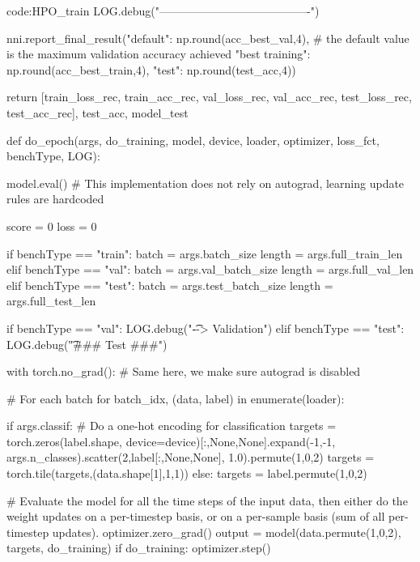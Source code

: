 \begin{mycodebox}{code:HPO_train}
        LOG.debug("----------------------------------------\n\n")

        nni.report_final_result({"default": np.round(acc_best_val,4), # the default value is the maximum validation accuracy achieved
                                 "best training": np.round(acc_best_train,4),
                                 "test": np.round(test_acc,4)})
    
    return [train_loss_rec, train_acc_rec, val_loss_rec, val_acc_rec, test_loss_rec, test_acc_rec], test_acc, model_test


def do_epoch(args, do_training, model, device, loader, optimizer, loss_fct, benchType, LOG):

    model.eval()    # This implementation does not rely on autograd, learning update rules are hardcoded
    
    score = 0
    loss = 0

    if benchType == "train":
        batch = args.batch_size
        length = args.full_train_len
    elif benchType == "val":
        batch = args.val_batch_size
        length = args.full_val_len
    elif benchType == "test":
        batch = args.test_batch_size
        length = args.full_test_len

    if benchType == "val":
        LOG.debug("\t --> Validation")
    elif benchType == "test":
        LOG.debug("\t ### Test ###")
    
    with torch.no_grad():   # Same here, we make sure autograd is disabled
        
        # For each batch
        for batch_idx, (data, label) in enumerate(loader):

            if args.classif:    # Do a one-hot encoding for classification
                targets = torch.zeros(label.shape, 
                    device=device)[:,None,None].expand(-1,-1,
                        args.n_classes).scatter(2,label[:,None,None], 1.0).permute(1,0,2)
                targets = torch.tile(targets,(data.shape[1],1,1))
            else:
                targets = label.permute(1,0,2)

            # Evaluate the model for all the time steps of the input data, then either do the weight updates on a per-timestep basis, or on a per-sample basis (sum of all per-timestep updates).
            optimizer.zero_grad()
            output = model(data.permute(1,0,2), targets, do_training)
            if do_training:
                optimizer.step()
                

\end{mycodebox}
